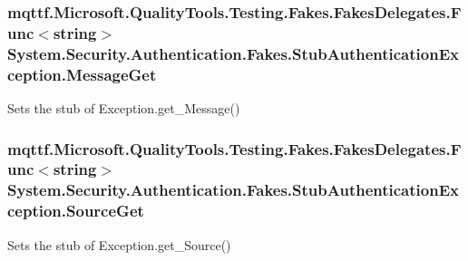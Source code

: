 \hypertarget{class_system_1_1_security_1_1_authentication_1_1_fakes_1_1_stub_authentication_exception_a5b73c6073e7d1dc77c35544c0146b89b}{
\subsubsection[{Message\-Get}]{\setlength{\rightskip}{0pt plus 5cm}mqttf.\-Microsoft.\-Quality\-Tools.\-Testing.\-Fakes.\-Fakes\-Delegates.\-Func$<$string$>$ System.\-Security.\-Authentication.\-Fakes.\-Stub\-Authentication\-Exception.\-Message\-Get}}\label{class_system_1_1_security_1_1_authentication_1_1_fakes_1_1_stub_authentication_exception_a5b73c6073e7d1dc77c35544c0146b89b}


Sets the stub of Exception.\-get\-\_\-\-Message()

\hypertarget{class_system_1_1_security_1_1_authentication_1_1_fakes_1_1_stub_authentication_exception_ae12e738589396f061aa0e02b8a524ade}{
\subsubsection[{Source\-Get}]{\setlength{\rightskip}{0pt plus 5cm}mqttf.\-Microsoft.\-Quality\-Tools.\-Testing.\-Fakes.\-Fakes\-Delegates.\-Func$<$string$>$ System.\-Security.\-Authentication.\-Fakes.\-Stub\-Authentication\-Exception.\-Source\-Get}}\label{class_system_1_1_security_1_1_authentication_1_1_fakes_1_1_stub_authentication_exception_ae12e738589396f061aa0e02b8a524ade}


Sets the stub of Exception.\-get\-\_\-\-Source()

